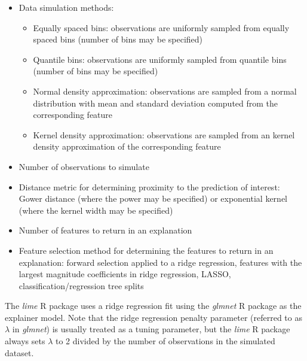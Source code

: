 \documentclass[AMS,STIX2COL]{WileyNJD-v2}\usepackage[]{graphicx}\usepackage[]{color}
\begin{document}
\begin{itemize}

\item Data simulation methods:

\begin{itemize}
\item Equally spaced bins: observations are uniformly sampled from equally spaced bins (number of bins may be specified)
\item Quantile bins: observations are uniformly sampled from quantile bins (number of bins may be specified)
\item Normal density approximation: observations are sampled from a normal distribution with mean and standard deviation computed from the corresponding feature
\item Kernel density approximation: observations are sampled from an kernel density approximation of the corresponding feature
\end{itemize}

\item Number of observations to simulate

\item Distance metric for determining proximity to the prediction of interest: Gower distance (where the power may be specified) or exponential kernel (where the kernel width may be specified)

\item Number of features to return in an explanation

\item Feature selection method for determining the features to return in an explanation: forward selection applied to a ridge regression, features with the largest magnitude coefficients in ridge regression, LASSO, classification/regression tree splits

\end{itemize}

The \emph{lime} R package uses a ridge regression fit using the \emph{glmnet} R package \citep{simon:2011} as the explainer model. Note that the ridge regression penalty parameter (referred to as $\lambda$ in \emph{glmnet}) is usually treated as a tuning parameter, but the \emph{lime} R package always sets $\lambda$ to 2 divided by the number of observations in the simulated dataset.
\end{document}
